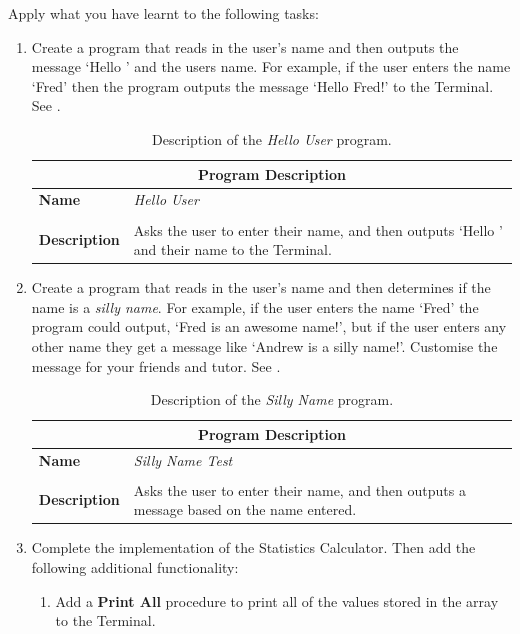 Apply what you have learnt to the following tasks:
\begin{enumerate}
  \item Create a program that reads in the user's name and then outputs the message `Hello ' and the users name. For example, if the user enters the name `Fred' then the program outputs the message `Hello Fred!' to the Terminal. See .
  
  \begin{table}[h]
  \centering
  \begin{tabular}{l|p{12cm}}
    \hline
    \multicolumn{2}{c}{\textbf{Program Description}} \\
    \hline
    \textbf{Name} & \emph{Hello User} \\
    \\
    \textbf{Description} & Asks the user to enter their name, and then outputs `Hello ' and their name to the Terminal. \\
    \hline
  \end{tabular}
  \caption{Description of the \emph{Hello User} program.}
  \label{tbl:hello-user}
  \end{table}
  
  \item Create a program that reads in the user's name and then determines if the name is a \emph{silly name}. For example, if the user enters the name `Fred' the program could output, `Fred is an awesome name!', but if the user enters any other name they get a message like `Andrew is a silly name!'. Customise the message for your friends and tutor. See .

  \begin{table}[h]
  \centering
  \begin{tabular}{l|p{12cm}}
    \hline
    \multicolumn{2}{c}{\textbf{Program Description}} \\
    \hline
    \textbf{Name} & \emph{Silly Name Test} \\
    \\
    \textbf{Description} & Asks the user to enter their name, and then outputs a message based on the name entered. \\
    \hline
  \end{tabular}
  \caption{Description of the \emph{Silly Name} program.}
  \label{tbl:silly_name}
  \end{table}
  
  \item Complete the implementation of the Statistics Calculator. Then add the following additional functionality:
  \begin{enumerate}
      \item Add a \textbf{Print All} procedure to print all of the values stored in the array to the Terminal.
      \begin{figure}[h]
      \end{figure}


\end{enumerate}
\end{enumerate}

